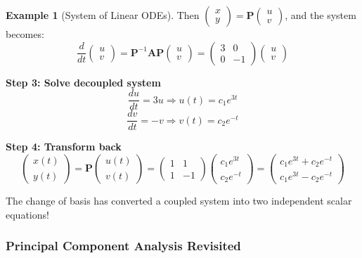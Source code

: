 \documentclass[12pt]{article}
\numberwithin{equation}{section}
\newcommand{\mat}[1]{\mathbf{#1}}        %
\theoremstyle{plain}
\theoremstyle{definition}
\newtheorem{example}[theorem]{Example}
\theoremstyle{remark}
\begin{document}
\begin{example}[System of Linear ODEs]
Then $\begin{pmatrix} x \\ y \end{pmatrix} = \mat{P}\begin{pmatrix} u \\ v \end{pmatrix}$, and the system becomes:
$$\frac{d}{dt}\begin{pmatrix} u \\ v \end{pmatrix} = \mat{P}^{-1}\mat{A}\mat{P}\begin{pmatrix} u \\ v \end{pmatrix} = \begin{pmatrix} 3 & 0 \\ 0 & -1 \end{pmatrix}\begin{pmatrix} u \\ v \end{pmatrix}$$

\textbf{Step 3: Solve decoupled system}
$$\frac{du}{dt} = 3u \Rightarrow u(t) = c_1 e^{3t}$$
$$\frac{dv}{dt} = -v \Rightarrow v(t) = c_2 e^{-t}$$

\textbf{Step 4: Transform back}
$$\begin{pmatrix} x(t) \\ y(t) \end{pmatrix} = \mat{P}\begin{pmatrix} u(t) \\ v(t) \end{pmatrix} = \begin{pmatrix} 1 & 1 \\ 1 & -1 \end{pmatrix}\begin{pmatrix} c_1 e^{3t} \\ c_2 e^{-t} \end{pmatrix} = \begin{pmatrix} c_1 e^{3t} + c_2 e^{-t} \\ c_1 e^{3t} - c_2 e^{-t} \end{pmatrix}$$

The change of basis has converted a coupled system into two independent scalar equations!
\end{example}

\subsubsection{Principal Component Analysis Revisited}
\end{document}
